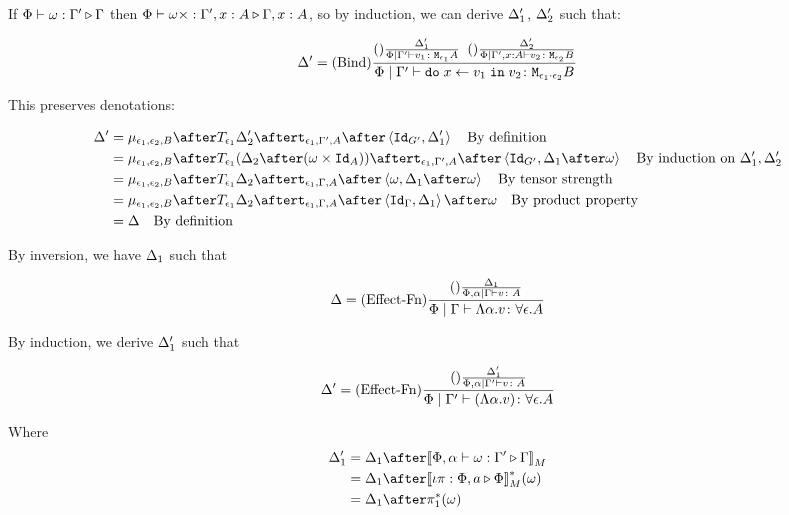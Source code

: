 \documentclass{report}
\begin{document}
    If $\Phi\vdash \omega : \Gamma' \triangleright \Gamma$ then $\Phi\vdash \omega\times : \Gamma',x:A \triangleright \Gamma, x: A$, so by induction, we can derive $\Delta_1'$, $\Delta_2'$ such that:

    \begin{equation}
        \Delta' = (\text{Bind}) \frac{
            (\text{}) \frac{\Delta_1'}{\Phi\mid\Gamma' \vdash v_1 \colon \texttt{M}_{\epsilon_1}{A}}
            \;\;
            (\text{}) \frac{\Delta_2'}{\Phi\mid\Gamma',x: A \vdash v_2 \colon \texttt{M}_{\epsilon_2}{B}}
        }{
            \Phi\mid\Gamma' \vdash \texttt{do}\; x \leftarrow v_1 \;\texttt{in}\; v_2 \colon \texttt{M}_{\epsilon_1\cdot\epsilon_2}{B}
        }
    \end{equation}

    This preserves denotations:

    \begin{align}
        \D' & = \bind{\e_1}{\e_2}{B}\after\T{\e_1}{\D_2'}\after\tstrength{\e_1}{\G'}{A}\after\pr{\Id{G'}}{\D_1'}\qt{By definition}\\
        & = \bind{\e_1}{\e_2}{B}\after\T{\e_1}{(\D_2\after(\w\times\Id{A}))}\after\tstrength{\e_1}{\G'}{A}\after\pr{\Id{G'}}{\D_1\after\w}\qt{By induction on $\D_1', \D_2'$}\\
        & = \bind{\e_1}{\e_2}{B}\after\T{\e_1}{\D_2}\after\tstrength{\e_1}{\G}{A}\after\pr{\w}{\D_1\after\w}\qt{By tensor strength}\\
        & = \bind{\e_1}{\e_2}{B}\after\T{\e_1}{\D_2}\after\tstrength{\e_1}{\G}{A}\after\pr{\idg}{\D_1}\after\w\qt{By product property}\\
        & = \D \qt{By definition}
    \end{align}




    By inversion, we have $\Delta_1$ such that
    
    \begin{equation}
        \Delta = (\text{Effect-Fn}) \frac{(\text{}) \frac{\Delta_1}{\Phi,\alpha\mid\Gamma \vdash v \colon A}}{\Phi\mid\Gamma \vdash \Lambda \alpha. v \colon \forall \epsilon. A}
    \end{equation}
    
    By induction, we derive $\Delta_1'$ such that
    
    \begin{equation}
        \Delta' = (\text{Effect-Fn}) \frac{(\text{}) \frac{\Delta_1'}{\Phi,\alpha\mid\Gamma' \vdash v \colon A}}{\Phi\mid\Gamma' \vdash (\Lambda \alpha. v) \colon \forall \epsilon. A}
    \end{equation}
    
    Where 
    \begin{align}
        \D_1' & = \D_1\after\deno{\ewrel{\P,\a}{\w}{\G'}{\G}}\\
        & = \D_1\after\deno{\wrel{\i\pi}{\P,a}{\P}}\star(\w)\\
        & = \D_1\after\pstar(\w)
    \end{align}
    
\end{document}
